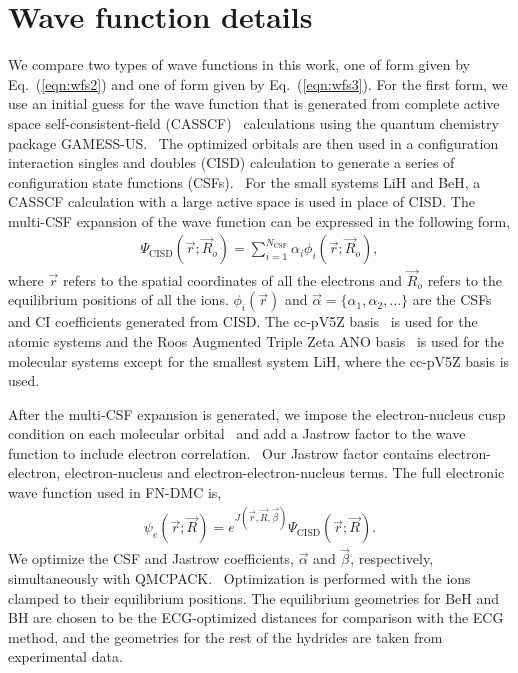 \documentclass[aip,jcp,numerical,reprint]{revtex4-1}
\begin{document}
\section{ Wave function details}
We compare two types of wave functions in this work, one of form given by Eq.~(\ref{eqn:wfs2}) and one of form given by  Eq.~(\ref{eqn:wfs3}).  For the first form, we use an initial guess for the wave function that is generated from complete active space self-consistent-field (CASSCF)~\cite{Chaban_MCSCF,Szabo} calculations using the quantum chemistry package GAMESS-US.~\cite{GAMESS} The optimized orbitals are then used in a configuration interaction singles and doubles (CISD) calculation to generate a series of configuration state functions (CSFs).~\cite{Pauncz_CSF} For the small systems LiH and BeH, a CASSCF calculation with a large active space is used in place of CISD. The multi-CSF expansion of the wave function can be expressed in the following form,
\begin{align}
\Psi_{\text{CISD}}(\vec{r};\vec{R}_o)=\sum\limits_{i=1}^{N_{\text{CSF}}}\alpha_i\phi_i(\vec{r};\vec{R}_o), \label{eq:psi_gms}
\end{align}
where $\vec{r}$ refers to the spatial coordinates of all the electrons and $\vec{R}_o$ refers to the equilibrium positions of all the ions. $\phi_i(\vec{r})$ and $\vec{\alpha}=\{\alpha_1,\alpha_2,\dots\}$ are the CSFs and CI coefficients generated from CISD. The cc-pV5Z basis~\cite{dunning} is used for the atomic systems and the Roos Augmented Triple Zeta ANO basis~\cite{roos} is used for the molecular systems except for the smallest system LiH, where the cc-pV5Z basis is used.

After the multi-CSF expansion is generated, we impose the electron-nucleus cusp condition on each molecular orbital~\cite{cusp} and add a Jastrow factor to the wave function to include electron correlation.~\cite{Kato} Our Jastrow factor contains electron-electron, electron-nucleus and electron-electron-nucleus terms. The full electronic wave function used in FN-DMC is,
\begin{align}
\psi_e(\vec{r};\vec{R})=e^{J(\vec{r},\vec{R},\vec{\beta})}\Psi_{\text{CISD}}(\vec{r};\vec{R})\label{eq:psie}.
\end{align}
We optimize the CSF and Jastrow coefficients, $\vec{\alpha}$ and $\vec{\beta}$, respectively, simultaneously with QMCPACK.~\cite{QMCPACK_Kim,QMCPACK_Esler} Optimization is performed with the ions clamped to their equilibrium positions. The equilibrium geometries for BeH and BH are chosen to be the ECG-optimized distances for comparison with the ECG  method, and the geometries for the rest of the hydrides are taken from experimental data.~\cite{CCCBDB}
\end{document}
